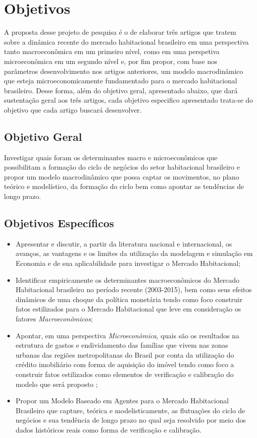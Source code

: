 \section{Objetivos}

A proposta desse projeto de pesquisa é o de elaborar três artigos que tratem sobre a dinâmica recente do mercado habitacional brasileiro em uma perspectiva tanto macroeconômica em um primeiro nível, como em uma perspetiva microeconômica em um segundo nível e, por fim propor, com base nos parâmetros desenvolvimento nos artigos anteriores, um modelo macrodinâmico que esteja microeconomicamente fundamentado para o mercado habitacional brasileiro. Desse forma, além do objetivo geral, apresentado abaixo, que dará sustentação geral aos três artigos, cada objetivo especifico apresentado trata-se do objetivo que cada artigo buscará desenvolver.

\subsection{Objetivo Geral}

Investigar quais foram os determinantes macro e microeconômicos que possibilitam a formação do ciclo de negócios do setor habitacional brasileiro e propor um modelo macrodinâmico que possa captar os movimentos, no plano teórico e modelístico, da formação do ciclo bem como apontar as tendências de longo prazo. 

\subsection{Objetivos Específicos}

\begin{itemize}
	\item Apresentar e discutir, a partir da literatura nacional e internacional, os avanços, as vantagens e os limites da utilização da modelagem e simulação em Economia e de sua aplicabilidade para investigar o Mercado Habitacional; %
	\item Identificar empiricamente os determinantes macroeconômicos do Mercado Habitacional brasileiro no período recente (2003-2015), bem como seus efeitos dinâmicos de uma choque da política monetária tendo como foco construir fatos estilizados para o Mercado Habitacional que leve em consideração os fatores \textit{Macroeconômicos};
	\item Apontar, em uma perspectiva \textit{Microeconômica}, quais são os resultados na estrutura de gastos e endividamento das famílias que vivem nas zonas urbanas das regiões metropolitanas do Brasil por conta da utilização do crédito imobiliário com forma de aquisição do imóvel tendo como foco a construir fatos estilizados como elementos de verificação e calibração do modelo que será proposto ;
	\item Propor um Modelo Baseado em Agentes para o Mercado Habitacional Brasileiro que capture, teórica e modelisticamente, as flutuações do ciclo de negócios e sua tendência de longo prazo no qual seja resolvido por meio dos dados históricos reais como forma de verificação e calibração.  
\end{itemize}